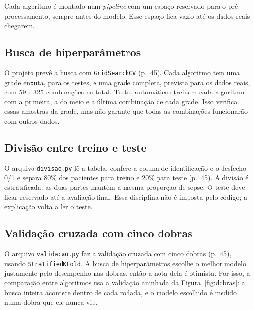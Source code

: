 \documentclass[11pt,a4paper]{article}
\newcommand{\cod}[1]{\texttt{#1}}
\begin{document}
Cada algoritmo é montado num \emph{pipeline} com um espaço reservado para o pré-processamento, sempre antes do modelo.
Esse espaço fica vazio até os dados reais chegarem.

\subsection{Busca de hiperparâmetros}

O projeto prevê a busca com \cod{GridSearchCV} (p.~45). Cada algoritmo tem uma grade enxuta, para os testes, e uma
grade completa, prevista para os dados reais, com 59 e 325 combinações no total. Testes automáticos treinam cada
algoritmo com a primeira, a do meio e a última combinação de cada grade. Isso verifica essas amostras da grade,
mas não garante que todas as combinações funcionarão com outros dados.

\subsection{Divisão entre treino e teste}

O arquivo \cod{divisao.py} lê a tabela, confere a coluna de identificação e o desfecho 0/1 e separa 80\% dos pacientes
para treino e 20\% para teste (p.~45). A divisão é estratificada: as duas partes mantêm a mesma proporção de sepse. O
teste deve ficar reservado até a avaliação final. Essa disciplina não é imposta pelo código; a explicação volta a ler o teste.

\subsection{Validação cruzada com cinco dobras}

O arquivo \cod{validacao.py} faz a validação cruzada com cinco dobras (p.~45), usando \cod{StratifiedKFold}. A busca
de hiperparâmetros escolhe o melhor modelo justamente pelo desempenho nas dobras, então a nota dela é otimista. Por
isso, a comparação entre algoritmos usa a validação aninhada da Figura~\ref{fig:dobras}: a busca inteira acontece
dentro de cada rodada, e o modelo escolhido é medido numa dobra que ele nunca viu.
\end{document}
